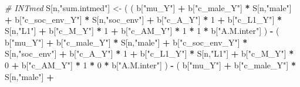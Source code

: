 \documentclass[
]{book}
\newenvironment{Shaded}{\begin{snugshade}}{\end{snugshade}}
\newcommand{\CommentTok}[1]{\textcolor[rgb]{0.56,0.35,0.01}{\textit{#1}}}
\newcommand{\DecValTok}[1]{\textcolor[rgb]{0.00,0.00,0.81}{#1}}
\newcommand{\NormalTok}[1]{#1}
\newcommand{\OtherTok}[1]{\textcolor[rgb]{0.56,0.35,0.01}{#1}}
\newcommand{\SpecialCharTok}[1]{\textcolor[rgb]{0.81,0.36,0.00}{\textbf{#1}}}
\newcommand{\StringTok}[1]{\textcolor[rgb]{0.31,0.60,0.02}{#1}}
\begin{document}
\begin{Shaded}
\begin{Highlighting}[]
    \CommentTok{\# INTmed }
\NormalTok{    S[n,}\StringTok{"sum.intmed"}\NormalTok{] }\OtherTok{\textless{}{-}}\NormalTok{ ( ( b[}\StringTok{"mu\_Y"}\NormalTok{] }\SpecialCharTok{+} 
\NormalTok{                               b[}\StringTok{"c\_male\_Y"}\NormalTok{] }\SpecialCharTok{*}\NormalTok{ S[n,}\StringTok{"male"}\NormalTok{] }\SpecialCharTok{+} 
\NormalTok{                               b[}\StringTok{"c\_soc\_env\_Y"}\NormalTok{] }\SpecialCharTok{*}\NormalTok{ S[n,}\StringTok{"soc\_env"}\NormalTok{] }\SpecialCharTok{+} 
\NormalTok{                               b[}\StringTok{"c\_A\_Y"}\NormalTok{] }\SpecialCharTok{*} \DecValTok{1} \SpecialCharTok{+} 
\NormalTok{                               b[}\StringTok{"c\_L1\_Y"}\NormalTok{] }\SpecialCharTok{*}\NormalTok{ S[n,}\StringTok{"L1"}\NormalTok{] }\SpecialCharTok{+}
\NormalTok{                               b[}\StringTok{"c\_M\_Y"}\NormalTok{] }\SpecialCharTok{*} \DecValTok{1} \SpecialCharTok{+}
\NormalTok{                               b[}\StringTok{"c\_AM\_Y"}\NormalTok{] }\SpecialCharTok{*} \DecValTok{1} \SpecialCharTok{*} \DecValTok{1} \SpecialCharTok{*}\NormalTok{ b[}\StringTok{"A.M.inter"}\NormalTok{] ) }\SpecialCharTok{{-}} 
\NormalTok{                             ( b[}\StringTok{"mu\_Y"}\NormalTok{] }\SpecialCharTok{+} 
\NormalTok{                                 b[}\StringTok{"c\_male\_Y"}\NormalTok{] }\SpecialCharTok{*}\NormalTok{ S[n,}\StringTok{"male"}\NormalTok{] }\SpecialCharTok{+} 
\NormalTok{                                 b[}\StringTok{"c\_soc\_env\_Y"}\NormalTok{] }\SpecialCharTok{*}\NormalTok{ S[n,}\StringTok{"soc\_env"}\NormalTok{] }\SpecialCharTok{+} 
\NormalTok{                                 b[}\StringTok{"c\_A\_Y"}\NormalTok{] }\SpecialCharTok{*} \DecValTok{1} \SpecialCharTok{+} 
\NormalTok{                                 b[}\StringTok{"c\_L1\_Y"}\NormalTok{] }\SpecialCharTok{*}\NormalTok{ S[n,}\StringTok{"L1"}\NormalTok{] }\SpecialCharTok{+}
\NormalTok{                                 b[}\StringTok{"c\_M\_Y"}\NormalTok{] }\SpecialCharTok{*} \DecValTok{0} \SpecialCharTok{+}
\NormalTok{                                 b[}\StringTok{"c\_AM\_Y"}\NormalTok{] }\SpecialCharTok{*} \DecValTok{1} \SpecialCharTok{*} \DecValTok{0} \SpecialCharTok{*}\NormalTok{ b[}\StringTok{"A.M.inter"}\NormalTok{] ) }\SpecialCharTok{{-}} 
\NormalTok{                             ( b[}\StringTok{"mu\_Y"}\NormalTok{] }\SpecialCharTok{+} 
\NormalTok{                                 b[}\StringTok{"c\_male\_Y"}\NormalTok{] }\SpecialCharTok{*}\NormalTok{ S[n,}\StringTok{"male"}\NormalTok{] }\SpecialCharTok{+} 

\end{Highlighting}
\end{Shaded}
\end{document}
